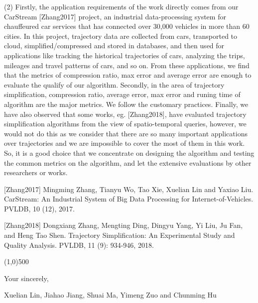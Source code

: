 \documentclass{letter}
\begin{document}
(2) Firstly, the application requirements of the work directly comes from our CarStream [Zhang2017] project, an industrial data-processing system for chauffeured car services that has connected over 30,000 vehicles in more than 60 cities. In this project, trajectory data are collected from cars, transported to cloud, simplified/compressed and stored in databases, and then used for applications like tracking the historical trajectories of cars, analyzing the trips, mileages and travel patterns of cars, and so on. From these applications, we find that the metrics of compression ratio, max error and average error are enough to evaluate the qualify of our algorithm. Secondly, in the area of trajectory simplification, compression ratio, average error, max error and runing time of algorithm are the major metrics. We follow the customary practices. Finally, we have also observed that some {works}, eg. [Zhang2018], have evaluated trajectory simplification algorithms from the view of spatio-temporal queries, however, we would not do this as we consider that there are so many important applications over trajectories and we are impossible to cover the most of them in this work. So, it is a good choice that we concentrate on designing the algorithm and testing the common metrics on the  algorithm, and let the extensive evaluations by other researchers or works.

[Zhang2017] Mingming Zhang, Tianyu Wo, Tao Xie, Xuelian Lin and Yaxiao Liu. CarStream: An Industrial System of Big Data Processing for Internet-of-Vehicles. PVLDB, 10 (12), 2017.

[Zhang2018] Dongxiang Zhang, Mengting Ding, Dingyu Yang, Yi Liu, Ju Fan, and Heng Tao Shen. Trajectory Simplification: An Experimental Study and Quality Analysis. PVLDB, 11 (9): 934-946, 2018.

\line(1,0){500}

Your sincerely,

Xuelian Lin, Jiahao Jiang, Shuai Ma, Yimeng Zuo and Chunming Hu
\end{document}
